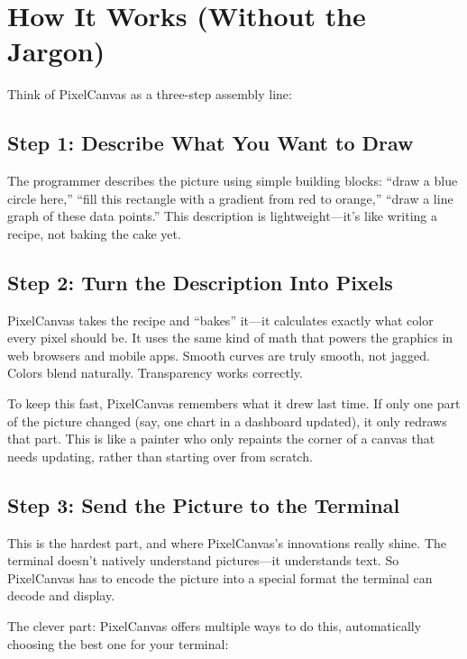 \documentclass[12pt, a4paper]{article}
\begin{document}
\section{How It Works (Without the Jargon)}

Think of PixelCanvas as a three-step assembly line:

\subsection{Step 1: Describe What You Want to Draw}

The programmer describes the picture using simple building blocks: ``draw a blue circle here,'' ``fill this rectangle with a gradient from red to orange,'' ``draw a line graph of these data points.'' This description is lightweight---it's like writing a recipe, not baking the cake yet.

\subsection{Step 2: Turn the Description Into Pixels}

PixelCanvas takes the recipe and ``bakes'' it---it calculates exactly what color every pixel should be. It uses the same kind of math that powers the graphics in web browsers and mobile apps. Smooth curves are truly smooth, not jagged. Colors blend naturally. Transparency works correctly.

To keep this fast, PixelCanvas remembers what it drew last time. If only one part of the picture changed (say, one chart in a dashboard updated), it only redraws that part. This is like a painter who only repaints the corner of a canvas that needs updating, rather than starting over from scratch.

\subsection{Step 3: Send the Picture to the Terminal}

This is the hardest part, and where PixelCanvas's innovations really shine. The terminal doesn't natively understand pictures---it understands text. So PixelCanvas has to encode the picture into a special format the terminal can decode and display.

The clever part: PixelCanvas offers multiple ways to do this, automatically choosing the best one for your terminal:
\end{document}
